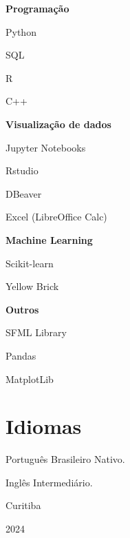 \documentclass{article}
\newcommand{\cvsection}[1]{\section*{\rmfamily#1}}
\begin{document}
{\large

\textbf{Programação}

\hspace{2em}Python

\hspace{2em}SQL

\hspace{2em}R

\hspace{2em}C++

\textbf{Visualização de dados}

\hspace{2em}Jupyter Notebooks

\hspace{2em}Rstudio

\hspace{2em}DBeaver

\hspace{2em}Excel (LibreOffice Calc)

\textbf{Machine Learning}

\hspace{2em}Scikit-learn

\hspace{2em}Yellow Brick

\textbf{Outros}

\hspace{2em}SFML Library

\hspace{2em}Pandas

\hspace{2em}MatplotLib



}

\indent
\cvsection{Idiomas}
\indent

{\large

Português Brasileiro Nativo.

Inglês Intermediário.

}

\vfill
\begin{center}
    {\Large 
    Curitiba

    2024
    }
\end{center}
\end{document}
